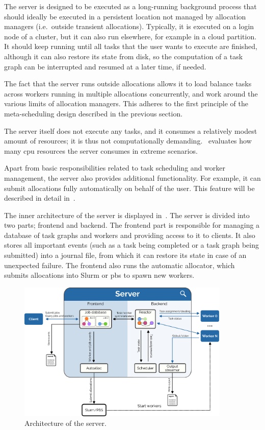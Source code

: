 The server is designed to be executed as a long-running background process that should ideally be
executed in a persistent location not managed by allocation managers (i.e.\ outside transient
allocations). Typically, it is executed on a login node of a cluster, but it can also run
elsewhere, for example in a cloud partition. It should keep running until all tasks that the user
wants to execute are finished, although it can also restore its state from disk, so the computation
of a task graph can be interrupted and resumed at a later time, if needed.

The fact that the server runs outside allocations allows it to load balance tasks across workers
running in multiple allocations concurrently, and work around the various limits of allocation
managers. This adheres to the first principle of the meta-scheduling design described in the
previous section.

The server itself does not execute any tasks, and it consumes a relatively modest amount of
resources; it is thus not computationally demanding.~ evaluates how many
\gls{cpu} resources the server consumes in extreme scenarios.

Apart from basic responsibilities related to task scheduling and worker management, the server also
provides additional functionality. For example, it can submit allocations fully automatically on
behalf of the user. This feature will be described in detail in~.

The inner architecture of the server is displayed in~. The server is divided
into two parts; frontend and backend. The frontend part is responsible for managing a database of
task graphs and workers and providing access to it to clients. It also stores all important events
(such as a task being completed or a task graph being submitted) into a journal file, from which it
can restore its state in case of an unexpected failure. The frontend also runs the automatic
allocator, which submits allocations into Slurm or \gls{pbs} to spawn new workers.

\begin{figure}[h]
	\centering
	\includegraphics[width=0.9\textwidth]{imgs/hq/server-architecture}
	\caption{Architecture of the \hyperqueue{} server.}
	\label{fig:hq-server-architecture}
\end{figure}

